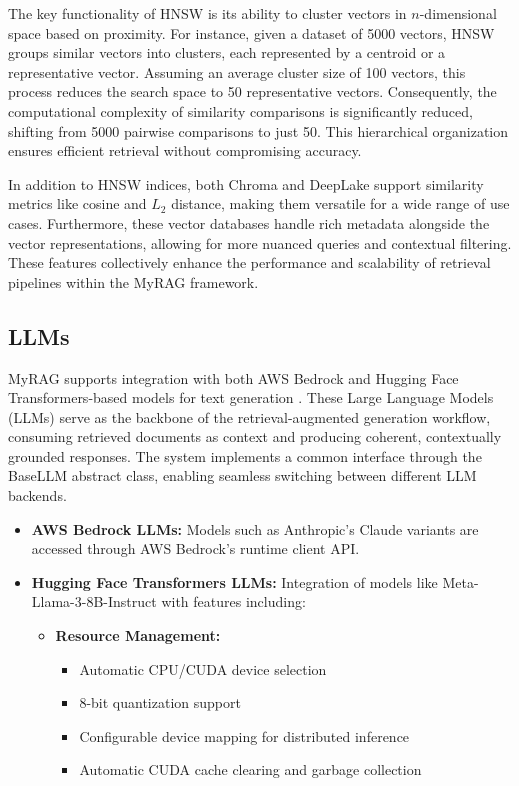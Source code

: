 \documentclass{scrartcl}
\begin{document}
The key functionality of HNSW is its ability to cluster vectors in \(n\)-dimensional space based on proximity. For instance, given a dataset of 5000 vectors, HNSW groups similar vectors into clusters, each represented by a centroid or a representative vector. Assuming an average cluster size of 100 vectors, this process reduces the search space to 50 representative vectors. Consequently, the computational complexity of similarity comparisons is significantly reduced, shifting from 5000 pairwise comparisons to just 50. This hierarchical organization ensures efficient retrieval without compromising accuracy.

In addition to HNSW indices, both Chroma and DeepLake support similarity metrics like cosine and \(L_2\) distance, making them versatile for a wide range of use cases. Furthermore, these vector databases handle rich metadata alongside the vector representations, allowing for more nuanced queries and contextual filtering. These features collectively enhance the performance and scalability of retrieval pipelines within the MyRAG framework.


\subsection{LLMs}
MyRAG supports integration with both AWS Bedrock and Hugging Face Transformers-based models for text generation \cite{huggingfacedocs, AmazonBedrockAPI2024}. These Large Language Models (LLMs) serve as the backbone of the retrieval-augmented generation workflow, consuming retrieved documents as context and producing coherent, contextually grounded responses. The system implements a common interface through the BaseLLM abstract class, enabling seamless switching between different LLM backends.

\begin{itemize}
    \item \textbf{AWS Bedrock LLMs:} Models such as Anthropic's Claude variants are accessed through AWS Bedrock's runtime client API. 
    
    \item \textbf{Hugging Face Transformers LLMs:} Integration of models like Meta-Llama-3-8B-Instruct with features including:
    \begin{itemize}
        \item \textbf{Resource Management:} 
            \begin{itemize}
                \item Automatic CPU/CUDA device selection
                \item 8-bit quantization support
                \item Configurable device mapping for distributed inference
                \item Automatic CUDA cache clearing and garbage collection
            \end{itemize}
    \end{itemize}
\end{itemize}
\end{document}
